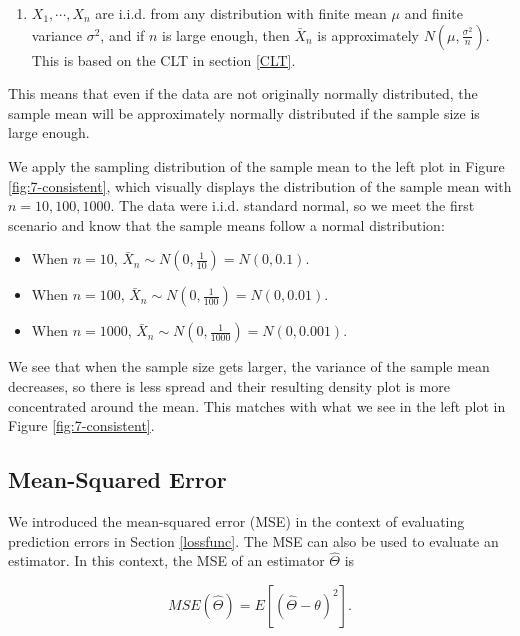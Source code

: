 \documentclass[
]{book}
\providecommand{\tightlist}{%
  \setlength{\itemsep}{0pt}\setlength{\parskip}{0pt}}
\begin{document}
\begin{enumerate}
\def\labelenumi{\arabic{enumi}.}
\setcounter{enumi}{1}
\tightlist
\item
  \(X_1, \cdots, X_n\) are i.i.d. from any distribution with finite mean \(\mu\) and finite variance \(\sigma^2\), and if \(n\) is large enough, then \(\bar{X}_n\) is approximately \(N(\mu, \frac{\sigma^2}{n})\). This is based on the CLT in section \ref{CLT}.
\end{enumerate}

This means that even if the data are not originally normally distributed, the sample mean will be approximately normally distributed if the sample size is large enough.

We apply the sampling distribution of the sample mean to the left plot in Figure \ref{fig:7-consistent}, which visually displays the distribution of the sample mean with \(n=10, 100, 1000\). The data were i.i.d. standard normal, so we meet the first scenario and know that the sample means follow a normal distribution:

\begin{itemize}
\tightlist
\item
  When \(n=10\), \(\bar{X}_n \sim N(0, \frac{1}{10}) = N(0, 0.1)\).
\item
  When \(n=100\), \(\bar{X}_n \sim N(0, \frac{1}{100}) = N(0,0.01)\).
\item
  When \(n=1000\), \(\bar{X}_n \sim N(0, \frac{1}{1000}) = N(0,0.001)\).
\end{itemize}

We see that when the sample size gets larger, the variance of the sample mean decreases, so there is less spread and their resulting density plot is more concentrated around the mean. This matches with what we see in the left plot in Figure \ref{fig:7-consistent}.

\hypertarget{estMSE}{%
\subsection{Mean-Squared Error}\label{estMSE}}

We introduced the mean-squared error (MSE) in the context of evaluating prediction errors in Section \ref{lossfunc}. The MSE can also be used to evaluate an estimator. In this context, the MSE of an estimator \(\hat{\Theta}\) is

\begin{equation} 
MSE(\hat{\Theta}) = E\left[(\hat{\Theta} - \theta)^2 \right].
\label{eq:7-MSE}
\end{equation}
\end{document}
